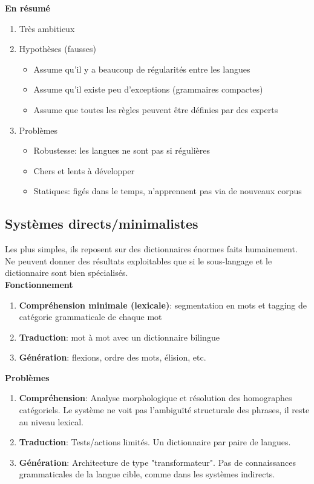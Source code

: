 \textbf{En résumé}

\begin{enumerate}
    \item Très ambitieux
    \item Hypothèses (fausses)
    \begin{itemize}
        \item Assume qu'il y a beaucoup de régularités entre les langues
        \item Assume qu'il existe peu d'exceptions (grammaires compactes)
        \item Assume que toutes les règles peuvent être définies par des experts
    \end{itemize}
    \item Problèmes
    \begin{itemize}
        \item Robustesse: les langues ne sont pas si régulières
        \item Chers et lents à développer
        \item Statiques: figés dans le temps, n'apprennent pas via de nouveaux corpus
    \end{itemize}
\end{enumerate}

\subsection{Systèmes directs/minimalistes}

Les plus simples, ils reposent sur des dictionnaires énormes faits humainement. Ne peuvent donner des résultats exploitables que si le sous-langage et le dictionnaire sont bien spécialisés.\\

\textbf{Fonctionnement}

\begin{enumerate}
    \item \textbf{Compréhension minimale (lexicale)}: segmentation en mots et tagging de catégorie grammaticale de chaque mot
    \item \textbf{Traduction}: mot à mot avec un dictionnaire bilingue
    \item \textbf{Génération}: flexions, ordre des mots, élision, etc.\\
\end{enumerate}

\textbf{Problèmes}

\begin{enumerate}
    \item \textbf{Compréhension}: Analyse morphologique et résolution des homographes catégoriels. Le système ne voit pas l’ambiguïté structurale des phrases, il reste au niveau lexical.
    \item \textbf{Traduction}: Tests/actions limités. Un dictionnaire par paire de langues.
    \item \textbf{Génération}: Architecture de type "transformateur". Pas de connaissances grammaticales de la langue cible, comme dans les systèmes indirects.\\
\end{enumerate}

